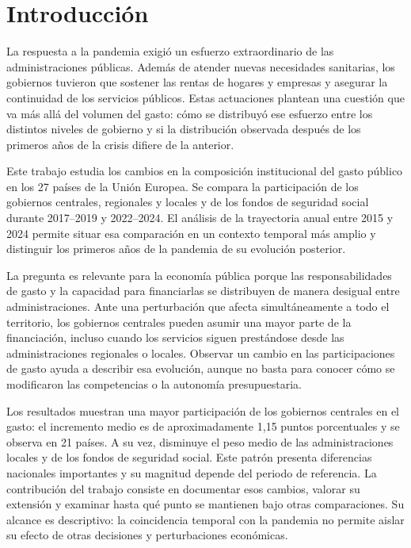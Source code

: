\documentclass[11pt,a4paper]{article}
\begin{document}
\section{Introducción}
La respuesta a la pandemia exigió un esfuerzo extraordinario de las administraciones públicas. Además de atender nuevas necesidades sanitarias, los gobiernos tuvieron que sostener las rentas de hogares y empresas y asegurar la continuidad de los servicios públicos. Estas actuaciones plantean una cuestión que va más allá del volumen del gasto: cómo se distribuyó ese esfuerzo entre los distintos niveles de gobierno y si la distribución observada después de los primeros años de la crisis difiere de la anterior.

Este trabajo estudia los cambios en la composición institucional del gasto público en los 27 países de la Unión Europea. Se compara la participación de los gobiernos centrales, regionales y locales y de los fondos de seguridad social durante 2017--2019 y 2022--2024. El análisis de la trayectoria anual entre 2015 y 2024 permite situar esa comparación en un contexto temporal más amplio y distinguir los primeros años de la pandemia de su evolución posterior.

La pregunta es relevante para la economía pública porque las responsabilidades de gasto y la capacidad para financiarlas se distribuyen de manera desigual entre administraciones. Ante una perturbación que afecta simultáneamente a todo el territorio, los gobiernos centrales pueden asumir una mayor parte de la financiación, incluso cuando los servicios siguen prestándose desde las administraciones regionales o locales. Observar un cambio en las participaciones de gasto ayuda a describir esa evolución, aunque no basta para conocer cómo se modificaron las competencias o la autonomía presupuestaria.

Los resultados muestran una mayor participación de los gobiernos centrales en el gasto: el incremento medio es de aproximadamente 1,15 puntos porcentuales y se observa en 21 países. A su vez, disminuye el peso medio de las administraciones locales y de los fondos de seguridad social. Este patrón presenta diferencias nacionales importantes y su magnitud depende del periodo de referencia. La contribución del trabajo consiste en documentar esos cambios, valorar su extensión y examinar hasta qué punto se mantienen bajo otras comparaciones. Su alcance es descriptivo: la coincidencia temporal con la pandemia no permite aislar su efecto de otras decisiones y perturbaciones económicas.
\end{document}
